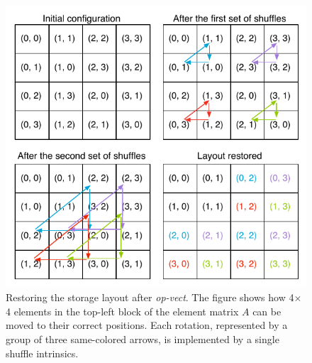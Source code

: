 \documentclass[conference]{IEEEtran}
\begin{document}
\begin{figure}[t]
\centerline{\includegraphics[scale=0.7]{Pictures/vect-restore.pdf}}
\caption{Restoring the storage layout after \emph{op-vect}. The figure shows how 4$\times$4 elements in the top-left block of the element matrix $A$ can be moved to their correct positions. Each rotation, represented by a group of three same-colored arrows, is implemented by a single shuffle intrinsics.}
\label{fig:restore-layout}
\end{figure}

\end{document}
